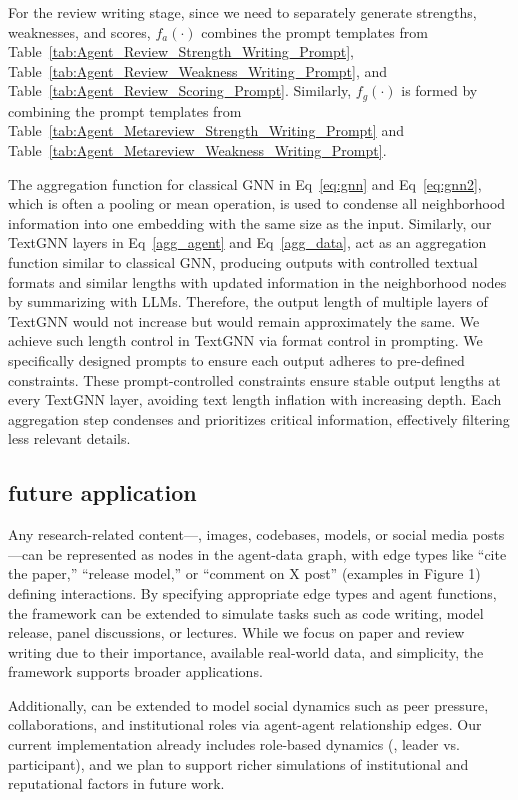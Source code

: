 For the review writing stage, since we need to separately generate strengths, weaknesses, and scores, $f_a(\cdot)$ combines the prompt templates from Table~\ref{tab:Agent_Review_Strength_Writing_Prompt}, Table~\ref{tab:Agent_Review_Weakness_Writing_Prompt}, and Table~\ref{tab:Agent_Review_Scoring_Prompt}. Similarly, $f_g(\cdot)$ is formed by combining the prompt templates from Table~\ref{tab:Agent_Metareview_Strength_Writing_Prompt} and Table~\ref{tab:Agent_Metareview_Weakness_Writing_Prompt}.

The aggregation function for classical GNN in Eq~\ref{eq:gnn} and Eq~\ref{eq:gnn2}, which is often a pooling or mean operation, is used to condense all neighborhood information into one embedding with the same size as the input. Similarly, our TextGNN layers in Eq~\ref{agg_agent} and Eq~\ref{agg_data}, act as an aggregation function similar to classical GNN, producing outputs with controlled textual formats and similar lengths with updated information in the neighborhood nodes by summarizing with LLMs. Therefore, the output length of multiple layers of TextGNN would not increase but would remain approximately the same. We achieve such length control in TextGNN via format control in prompting. We specifically designed prompts to ensure each output adheres to pre-defined constraints. These prompt-controlled constraints ensure stable output lengths at every TextGNN layer, avoiding text length inflation with increasing depth. Each aggregation step condenses and prioritizes critical information, effectively filtering less relevant details.

\subsection{\envname future application} 
Any research-related content—\eg, images, codebases, models, or social media posts—can be represented as nodes in the agent-data graph, with edge types like “cite the paper,” “release model,” or “comment on X post” (examples in Figure 1) defining interactions. By specifying appropriate edge types and agent functions, the framework can be extended to simulate tasks such as code writing, model release, panel discussions, or lectures. While we focus on paper and review writing due to their importance, available real-world data, and simplicity, the framework supports broader applications.

Additionally, \envname can be extended to model social dynamics such as peer pressure, collaborations, and institutional roles via agent-agent relationship edges. Our current implementation already includes role-based dynamics (\eg, leader vs. participant), and we plan to support richer simulations of institutional and reputational factors in future work.

